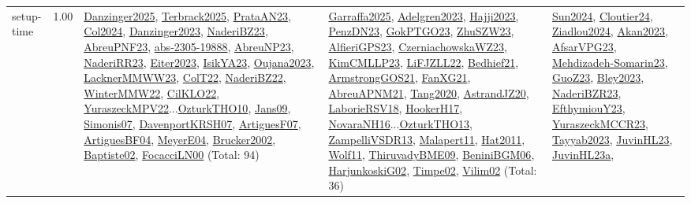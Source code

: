 {\begin{longtable}{p{3cm}r>{\raggedright\arraybackslash}p{6cm}>{\raggedright\arraybackslash}p{6cm}>{\raggedright\arraybackslash}p{8cm}}
\index{setup-time}\index{Concepts!setup-time}setup-time &  1.00 & \hyperref[detail:Danzinger2025]{Danzinger2025}, \hyperref[detail:Terbrack2025]{Terbrack2025}, \hyperref[detail:PrataAN23]{PrataAN23}, \hyperref[detail:Col2024]{Col2024}, \hyperref[detail:Danzinger2023]{Danzinger2023}, \hyperref[detail:NaderiBZ23]{NaderiBZ23}, \hyperref[detail:AbreuPNF23]{AbreuPNF23}, \hyperref[detail:abs-2305-19888]{abs-2305-19888}, \hyperref[detail:AbreuNP23]{AbreuNP23}, \hyperref[detail:NaderiRR23]{NaderiRR23}, \hyperref[detail:Eiter2023]{Eiter2023}, \hyperref[detail:IsikYA23]{IsikYA23}, \hyperref[detail:Oujana2023]{Oujana2023}, \hyperref[detail:LacknerMMWW23]{LacknerMMWW23}, \hyperref[detail:ColT22]{ColT22}, \hyperref[detail:NaderiBZ22]{NaderiBZ22}, \hyperref[detail:WinterMMW22]{WinterMMW22}, \hyperref[detail:CilKLO22]{CilKLO22}, \hyperref[detail:YuraszeckMPV22]{YuraszeckMPV22}...\hyperref[detail:OzturkTHO10]{OzturkTHO10}, \hyperref[detail:Jans09]{Jans09}, \hyperref[detail:Simonis07]{Simonis07}, \hyperref[detail:DavenportKRSH07]{DavenportKRSH07}, \hyperref[detail:ArtiguesF07]{ArtiguesF07}, \hyperref[detail:ArtiguesBF04]{ArtiguesBF04}, \hyperref[detail:MeyerE04]{MeyerE04}, \hyperref[detail:Brucker2002]{Brucker2002}, \hyperref[detail:Baptiste02]{Baptiste02}, \hyperref[detail:FocacciLN00]{FocacciLN00} (Total: 94) & \hyperref[detail:Garraffa2025]{Garraffa2025}, \hyperref[detail:Adelgren2023]{Adelgren2023}, \hyperref[detail:Hajji2023]{Hajji2023}, \hyperref[detail:PenzDN23]{PenzDN23}, \hyperref[detail:GokPTGO23]{GokPTGO23}, \hyperref[detail:ZhuSZW23]{ZhuSZW23}, \hyperref[detail:AlfieriGPS23]{AlfieriGPS23}, \hyperref[detail:CzerniachowskaWZ23]{CzerniachowskaWZ23}, \hyperref[detail:KimCMLLP23]{KimCMLLP23}, \hyperref[detail:LiFJZLL22]{LiFJZLL22}, \hyperref[detail:Bedhief21]{Bedhief21}, \hyperref[detail:ArmstrongGOS21]{ArmstrongGOS21}, \hyperref[detail:FanXG21]{FanXG21}, \hyperref[detail:AbreuAPNM21]{AbreuAPNM21}, \hyperref[detail:Tang2020]{Tang2020}, \hyperref[detail:AstrandJZ20]{AstrandJZ20}, \hyperref[detail:LaborieRSV18]{LaborieRSV18}, \hyperref[detail:HookerH17]{HookerH17}, \hyperref[detail:NovaraNH16]{NovaraNH16}...\hyperref[detail:OzturkTHO13]{OzturkTHO13}, \hyperref[detail:ZampelliVSDR13]{ZampelliVSDR13}, \hyperref[detail:Malapert11]{Malapert11}, \hyperref[detail:Hat2011]{Hat2011}, \hyperref[detail:Wolf11]{Wolf11}, \hyperref[detail:ThiruvadyBME09]{ThiruvadyBME09}, \hyperref[detail:BeniniBGM06]{BeniniBGM06}, \hyperref[detail:HarjunkoskiG02]{HarjunkoskiG02}, \hyperref[detail:Timpe02]{Timpe02}, \hyperref[detail:Vilim02]{Vilim02} (Total: 36) & \hyperref[detail:Sun2024]{Sun2024}, \hyperref[detail:Cloutier24]{Cloutier24}, \hyperref[detail:Ziadlou2024]{Ziadlou2024}, \hyperref[detail:Akan2023]{Akan2023}, \hyperref[detail:AfsarVPG23]{AfsarVPG23}, \hyperref[detail:Mehdizadeh-Somarin23]{Mehdizadeh-Somarin23}, \hyperref[detail:GuoZ23]{GuoZ23}, \hyperref[detail:Bley2023]{Bley2023}, \hyperref[detail:NaderiBZR23]{NaderiBZR23}, \hyperref[detail:EfthymiouY23]{EfthymiouY23}, \hyperref[detail:YuraszeckMCCR23]{YuraszeckMCCR23}, \hyperref[detail:Tayyab2023]{Tayyab2023}, \hyperref[detail:JuvinHL23]{JuvinHL23}, \hyperref[detail:JuvinHL23a]{JuvinHL23a}, 
\end{longtable}}
